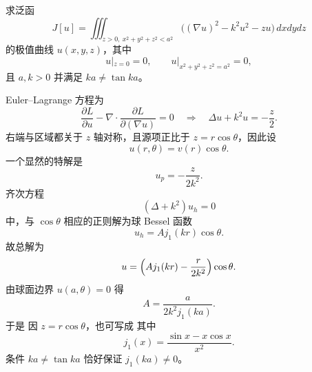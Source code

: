 \begin{question}[泛函极值曲线]

求泛函
\[
J[u]=\iiint_{z>0,\ x^2+y^2+z^2<a^2}\bigl((\nabla u)^2-k^2u^2-zu\bigr)\,dxdydz
\]
的极值曲线 $u(x,y,z)$，其中
\[
 u|_{z=0}=0,
 \qquad u|_{x^2+y^2+z^2=a^2}=0,
\]
且 $a,k>0$ 并满足 $ka\ne \tan ka$。

\begin{solution}

Euler--Lagrange 方程为
\[
\frac{\partial L}{\partial u}-\nabla\cdot\frac{\partial L}{\partial (\nabla u)}=0
\quad\Longrightarrow\quad
\Delta u+k^2u=-\frac{z}{2}.
\]
右端与区域都关于 $z$ 轴对称，且源项正比于 $z=r\cos\theta$，因此设
\[
 u(r,\theta)=v(r)\cos\theta.
\]
一个显然的特解是
\[
 u_p=-\frac{z}{2k^2}.
\]
齐次方程
\[
(\Delta+k^2)u_h=0
\]
中，与 $\cos\theta$ 相应的正则解为球 Bessel 函数
\[
 u_h=A j_1(kr)\cos\theta.
\]
故总解为
\[
 u=\Bigl(Aj_1(kr)-\frac{r}{2k^2}\Bigr)\cos\theta.
\]
由球面边界 $u(a,\theta)=0$ 得
\[
 A=\frac{a}{2k^2j_1(ka)}.
\]
于是
因 $z=r\cos\theta$，也可写成
其中
\[
 j_1(x)=\frac{\sin x-x\cos x}{x^2}.
\]
条件 $ka\ne \tan ka$ 恰好保证 $j_1(ka)\ne 0$。

\end{solution}
\end{question}

\clearpage

